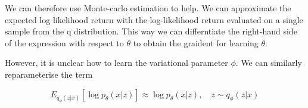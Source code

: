 \documentclass[11pt]{article}
\begin{document}
We can therefore use Monte-carlo estimation to help. We can approximate the expected log likelihood return with the log-likelihood return evaluated on a single sample from the q distribution. This way we can differntiate the right-hand side of the expression with respect to $\theta$ to obtain the graident for learning $\theta$.

\begin{figure}[H]
    \centering
\end{figure}

However, it is unclear how to learn the variational parameter $\phi$. We can similarly reparameterise the term

\begin{equation}
    E_{q_\phi(z|x)}[\log p_\theta(x|z)] \approx \log p_\theta(x|z), \quad z \sim q_\phi(z|x)
\end{equation}
\end{document}
